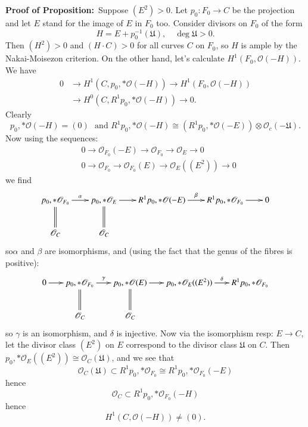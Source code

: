 \medskip
\noindent
{\bf Proof of Proposition:}~Suppose $(E^{2})>0$. Let $p_{0}:F_{0}\to
C$ be the projection and let $E$ stand for the image of $E$ in $F_{0}$
too. Consider divisors on $F_{0}$ of the form
$$
H=E+p^{-1}_{0}(\mathfrak{U}),\quad \deg \mathfrak{U}>0.
$$
Then $(H^{2})>0$ and $(H\cdot C)>0$ for all curves $C$ on $F_{0}$, so
$H$ is ample by the Nakai-Moisezon criterion. On the other hand, let's
calculate $H^{1}(F_{0},\mathscr{O}(-H))$. We have
\begin{align*}
0 &\to H^{1}(C,p_{0},\ast \mathscr{O}(-H))\to
H^{1}(F_{0},\mathscr{O}(-H))\\
& \to H^{0}(C,R^{1}p_{0},\ast \mathscr{O}(-H))\to 0.
\end{align*}
Clearly
$$
p_{0},\ast \mathscr{O}(-H)=(0)\text{~ and~
}R^{1}p_{0},\ast\mathscr{O}(-H)\cong
(R^{1}p_{0},\ast\mathscr{O}(-E))\otimes \mathscr{O}_{c}(-\mathfrak{U}).
$$
Now using the sequences:
\begin{align*}
&
0\to \mathscr{O}_{F_{0}}(-E)\to \mathscr{O}_{F_{0}}\to \mathscr{O}_{E}\to
0\\
&
0\to \mathscr{O}_{F_{0}}\to \mathscr{O}_{F_{0}}(E)\to \mathscr{O}_{E}((E^{2}))\to 0
\end{align*}
we find
\[
\xymatrix@C=.7cm{
p_{0},\ast \mathscr{O}_{F_{0}}\ar@{=}[d]\ar[r]^-{\alpha} &
p_{0},\ast \mathscr{O}_{E}\ar@{=}[d]\ar[r] &
R^{1}p_{0},\ast\mathscr{O}(-E)\ar[r]^-{\beta} &
R^{1}p_{0},\ast \mathscr{O}_{F_{0}}\ar[r] & 0\\
\mathscr{O}_{C} & \mathscr{O}_{C} & 
}
\]
so\pageoriginale $\alpha$ and $\beta$ are isomorphisms, and (using the
fact that the 
genus of the fibres is positive):
\[
\xymatrix@C=.6cm{
0\ar[r] & p_{0},\ast\mathscr{O}_{F_{0}}\ar@{=}[d]\ar[r]^-{\gamma} &
p_{0},\ast \mathscr{O}(E)\ar@{=}[d]\ar[r] &
p_{0},\ast\mathscr{O}_{E}((E^{2}))\ar[r]^-{\delta} &
R^{1}p_{0},\ast \mathscr{O}_{F_{0}}\\ 
 & \mathscr{O}_{C} & \mathscr{O}_{C} & 
} 
\]
so $\gamma$ is an isomorphism, and $\delta$ is injective. Now via the
isomorphism resp: $E\to C$, let the divisor class $(E^{2})$ on $E$
correspond to the divisor class $\mathfrak{U}$ on $C$. Then
$p_{0},\ast \mathscr{O}_{E}((E^{2}))\cong \mathscr{O}_{C}(\mathfrak{U})$,
and we see that
$$
\mathscr{O}_{C}(\mathfrak{U})\subset
R^{1}p_{0},\ast \mathscr{O}_{F_{0}}\cong R^{1}p_{0},\ast\mathscr{O}_{F_{0}}(-E)
$$
hence
$$
\mathscr{O}_{C}\subset R^{1}p_{0},\ast \mathscr{O}_{F_{0}}(-H)
$$
hence
\begin{equation*}
H^{1}(C,\mathscr{O}(-H))\neq (0).\tag*{Q.E.D.}
\end{equation*}

